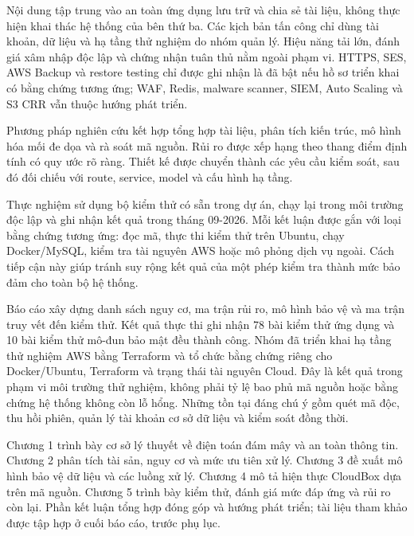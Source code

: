 Nội dung tập trung vào an toàn ứng dụng lưu trữ và chia sẻ tài liệu, không thực hiện khai thác hệ thống của bên thứ ba. Các kịch bản tấn công chỉ dùng tài khoản, dữ liệu và hạ tầng thử nghiệm do nhóm quản lý. Hiệu năng tải lớn, đánh giá xâm nhập độc lập và chứng nhận tuân thủ nằm ngoài phạm vi. HTTPS, SES, AWS Backup và restore testing chỉ được ghi nhận là đã bật nếu hồ sơ triển khai có bằng chứng tương ứng; WAF, Redis, malware scanner, SIEM, Auto Scaling và S3 CRR vẫn thuộc hướng phát triển.

Phương pháp nghiên cứu kết hợp tổng hợp tài liệu, phân tích kiến trúc, mô hình hóa mối đe dọa và rà soát mã nguồn. Rủi ro được xếp hạng theo thang điểm định tính có quy ước rõ ràng. Thiết kế được chuyển thành các yêu cầu kiểm soát, sau đó đối chiếu với route, service, model và cấu hình hạ tầng.

Thực nghiệm sử dụng bộ kiểm thử có sẵn trong dự án, chạy lại trong môi trường độc lập và ghi nhận kết quả trong tháng 09-2026. Mỗi kết luận được gắn với loại bằng chứng tương ứng: đọc mã, thực thi kiểm thử trên Ubuntu, chạy Docker/MySQL, kiểm tra tài nguyên AWS hoặc mô phỏng dịch vụ ngoài. Cách tiếp cận này giúp tránh suy rộng kết quả của một phép kiểm tra thành mức bảo đảm cho toàn bộ hệ thống.

Báo cáo xây dựng danh sách nguy cơ, ma trận rủi ro, mô hình bảo vệ và ma trận truy vết đến kiểm thử. Kết quả thực thi ghi nhận 78 bài kiểm thử ứng dụng và 10 bài kiểm thử mô-đun bảo mật đều thành công. Nhóm đã triển khai hạ tầng thử nghiệm AWS bằng Terraform và tổ chức bằng chứng riêng cho Docker/Ubuntu, Terraform và trạng thái tài nguyên Cloud. Đây là kết quả trong phạm vi môi trường thử nghiệm, không phải tỷ lệ bao phủ mã nguồn hoặc bằng chứng hệ thống không còn lỗ hổng. Những tồn tại đáng chú ý gồm quét mã độc, thu hồi phiên, quản lý tài khoản cơ sở dữ liệu và kiểm soát đồng thời.

Chương 1 trình bày cơ sở lý thuyết về điện toán đám mây và an toàn thông tin. Chương 2 phân tích tài sản, nguy cơ và mức ưu tiên xử lý. Chương 3 đề xuất mô hình bảo vệ dữ liệu và các luồng xử lý. Chương 4 mô tả hiện thực CloudBox dựa trên mã nguồn. Chương 5 trình bày kiểm thử, đánh giá mức đáp ứng và rủi ro còn lại. Phần kết luận tổng hợp đóng góp và hướng phát triển; tài liệu tham khảo được tập hợp ở cuối báo cáo, trước phụ lục.
\clearpage
{}
\hypersetup{pageanchor=true}
